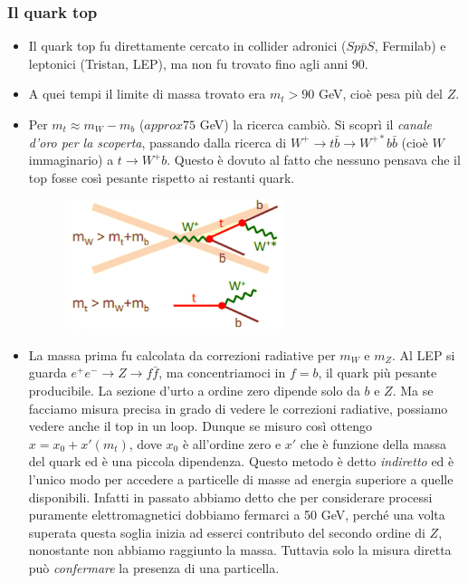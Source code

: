 \subsubsection{Il quark top}
\begin{itemize}
    \item Il quark top fu direttamente cercato in collider adronici ($Sp\bar pS$, Fermilab) e leptonici (Tristan, LEP), ma non fu trovato fino agli anni 90.
    \item A quei tempi il limite di massa trovato era $m_t>90$ GeV, cioè pesa più del $Z$.
    \item Per $m_t\approx m_W-m_b$ ($approx 75$ GeV) la ricerca cambiò. Si scoprì il \textit{canale d'oro per la scoperta}, passando dalla ricerca di $W^+\to t\bar b\to W^{+*}b\bar b$ (cioè $W$ immaginario) a $t\to W^+b$. Questo è dovuto al fatto che nessuno pensava che il top fosse così pesante rispetto ai restanti quark.
    \begin{figure}[H]
        \centering
        \includegraphics[width=0.6\textwidth]{immagini/fig_t_quark_research.png}
    \end{figure}
    \item La massa prima fu calcolata da correzioni radiative per $m_W$ e $m_Z$. Al LEP si guarda $e^+e^-\to Z\to f\bar f$, ma concentriamoci in $f=b$, il quark più pesante producibile. La sezione d'urto a ordine zero dipende solo da $b$ e $Z$. Ma se facciamo misura precisa in grado di vedere le correzioni radiative, possiamo vedere anche il top in un loop. Dunque se misuro così ottengo $x=x_0+x'(m_t)$, dove $x_0$ è all'ordine zero e $x'$ che è funzione della massa del quark ed è una piccola dipendenza. Questo metodo è detto \textit{indiretto} ed è l'unico modo per accedere a particelle di masse ad energia superiore a quelle disponibili. Infatti in passato abbiamo detto che per considerare processi puramente elettromagnetici dobbiamo fermarci a 50 GeV, perché una volta superata questa soglia inizia ad esserci contributo del secondo ordine di $Z$, nonostante non abbiamo raggiunto la massa. Tuttavia solo la misura diretta può \textit{confermare} la presenza di una particella.

\end{itemize}
